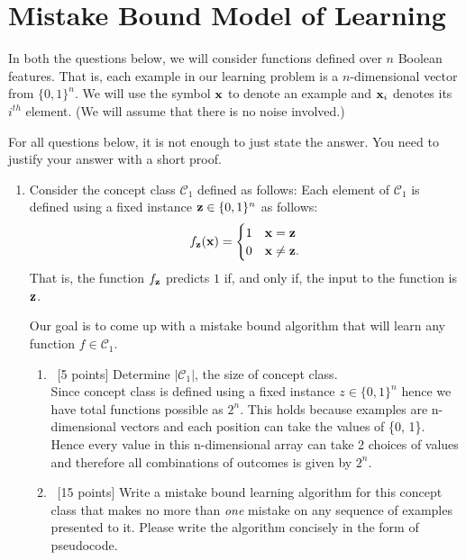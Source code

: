 \section{Mistake Bound Model of Learning}\label{sec:q3}

In both the questions below, we will consider functions defined over
$n$ Boolean features. That is, each example in our learning problem
is a $n$-dimensional vector from $\{0, 1\}^n$. We will use the
symbol ${\bf x}$ to denote an example and ${\bf x}_i$ denotes its $i^{th}$
element.  (We will assume that there is no noise involved.)

For all questions below, it is not enough to just state the
answer. You need to justify your answer with a short proof.


\begin{enumerate}
\item Consider the concept class $\mathcal{C}_1$ defined as follows:
  Each element of $\mathcal{C}_1$ is defined using a fixed instance
  ${\bf z} \in \{0, 1\}^n$ as follows:
  \begin{equation*}
    f_{\bf z}({\bf x}) = \begin{cases}
      1 & {\bf x} = {\bf z} \\
      0 & {\bf x} \ne {\bf z}.
    \end{cases}
  \end{equation*}
  That is, the function $f_{\bf z}$ predicts $1$ if, and only if, the
  input to the function is ${\bf z}$.

  Our goal is to come up with a mistake bound algorithm that will
  learn any function $f\in\mathcal{C}_1$.
  
  \begin{enumerate}
  \item~[5 points] Determine $\vert\mathcal{C}_1\vert$, the size of
    concept class.
    \\Since concept class is defined using a fixed instance $z \in \{0, 1\}^n$ hence we have total functions possible as $2^n$.
    This holds because examples are n-dimensional vectors and each position can take the values of \{0, 1\}. Hence every value in this n-dimensional array can take 2 choices of values and therefore all combinations of outcomes is given by $2^n$.
    
  \item~[15 points] Write a mistake bound learning algorithm for
    this concept class that makes no more than {\em one} mistake on
    any sequence of examples presented to it. Please write the
    algorithm concisely in the form of pseudocode.


\end{enumerate}
\end{enumerate}
